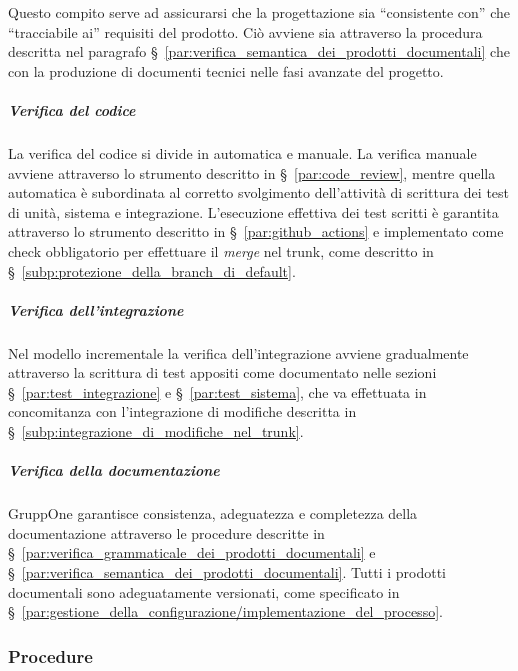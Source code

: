 \documentclass[../../norme-di-progetto.tex]{subfiles}
\begin{document}
Questo compito serve ad assicurarsi che la progettazione sia ``consistente con'' che ``tracciabile ai'' requisiti del prodotto. Ciò avviene sia attraverso la procedura descritta nel paragrafo §~\ref{par:verifica_semantica_dei_prodotti_documentali} che con la produzione di documenti tecnici nelle fasi avanzate del progetto.


\subparagraph{Verifica del codice}%
\label{subp:verifica_del_codice}

La verifica del codice si divide in automatica e manuale.
La verifica manuale avviene attraverso lo strumento descritto in §~\ref{par:code_review}, mentre quella automatica è subordinata al corretto svolgimento dell'attività di scrittura dei test di unità, sistema e integrazione.
L'esecuzione effettiva dei test scritti è garantita attraverso lo strumento descritto in §~\ref{par:github_actions} e implementato come check obbligatorio per effettuare il \textit{merge} nel trunk, come descritto in §~\ref{subp:protezione_della_branch_di_default}.


\subparagraph{Verifica dell'integrazione}%
\label{subp:verifica_dell_integrazione}

Nel modello incrementale la verifica dell'integrazione avviene gradualmente attraverso la scrittura di test appositi come documentato nelle sezioni §~\ref{par:test_integrazione} e §~\ref{par:test_sistema}, che va effettuata in concomitanza con l'integrazione di modifiche descritta in §~\ref{subp:integrazione_di_modifiche_nel_trunk}.


\subparagraph{Verifica della documentazione}%
\label{subp:verifica_della_documentazione}

GruppOne garantisce consistenza, adeguatezza e completezza della documentazione attraverso le procedure descritte in §~\ref{par:verifica_grammaticale_dei_prodotti_documentali} e §~\ref{par:verifica_semantica_dei_prodotti_documentali}.
Tutti i prodotti documentali sono adeguatamente versionati, come specificato in §~\ref{par:gestione_della_configurazione/implementazione_del_processo}.



\subsubsection{Procedure}%
\label{subs:verifica/procedure}
\end{document}
